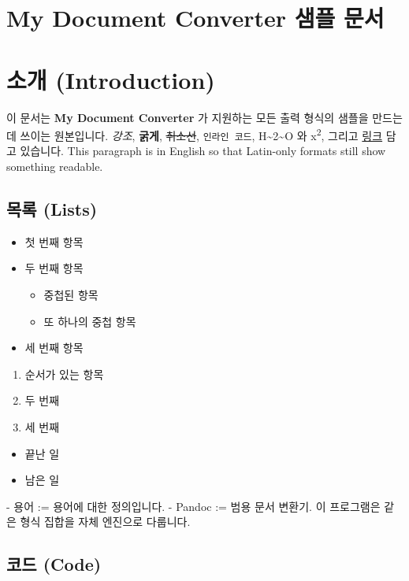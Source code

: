 \documentclass[11pt]{article}
\date{}
\begin{document}
\section*{My Document Converter 샘플 문서}\label{my-document-converter-샘플-문서}

\section*{소개 (Introduction)}\label{소개-introduction}

이 문서는 \textbf{My Document Converter} 가 지원하는 모든 출력 형식의 샘플을 만드는 데 쓰이는
원본입니다. \emph{강조}, \textbf{굵게}, \sout{취소선}, \verb|인라인 코드|,
H\textasciitilde{}2\textasciitilde{}O 와 x\textsuperscript{2}, 그리고
\href{https://example.com를}{링크} 담고 있습니다. This paragraph is in English so
that Latin-only formats still show something readable.

\subsection*{목록 (Lists)}\label{목록-lists}

\begin{itemize}
\item 첫 번째 항목
\item 두 번째 항목
\begin{itemize}
\item 중첩된 항목
\item 또 하나의 중첩 항목
\end{itemize}
\item 세 번째 항목
\end{itemize}

\begin{enumerate}
\item 순서가 있는 항목
\item 두 번째
\item 세 번째
\end{enumerate}

\begin{itemize}
\item 끝난 일
\item 남은 일
\end{itemize}

- 용어 := 용어에 대한 정의입니다.
- Pandoc := 범용 문서 변환기. 이 프로그램은 같은 형식 집합을 자체 엔진으로 다룹니다.

\subsection*{코드 (Code)}\label{코드-code}
\end{document}
